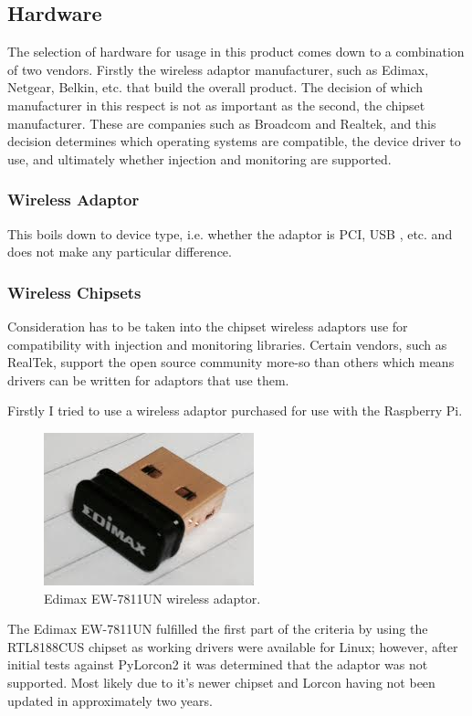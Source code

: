 \subsection{Hardware}
\label{research:hardware}
The selection of hardware for usage in this product comes down to a combination of two vendors. Firstly the wireless adaptor manufacturer, such as Edimax, Netgear, Belkin, etc. that build the overall product. The decision of which manufacturer in this respect is not as important as the second, the chipset manufacturer.  These are companies such as Broadcom and Realtek, and this decision determines which operating systems are compatible, the device driver to use, and ultimately whether injection and monitoring are supported.

\subsubsection{Wireless Adaptor}
This boils down to device type, i.e. whether the adaptor is PCI, USB , etc. and does not make any particular difference.
\subsubsection{Wireless Chipsets}
Consideration has to be taken into the chipset wireless adaptors use for compatibility with injection and monitoring libraries. Certain vendors, such as RealTek, support the open source community more-so than others which means drivers can be written for adaptors that use them.

Firstly I tried to use a wireless adaptor purchased for use with the Raspberry Pi.

\begin{figure}[h!]
\centering\includegraphics{research/figures/edimax.png}
\caption{Edimax EW-7811UN wireless adaptor.}
\end{figure}

The Edimax EW-7811UN fulfilled the first part of the criteria by using the RTL8188CUS chipset as working drivers were available for Linux; however, after initial tests against PyLorcon2 it was determined that the adaptor was not supported. Most likely due to it's newer chipset and Lorcon having not been updated in approximately two years. 

